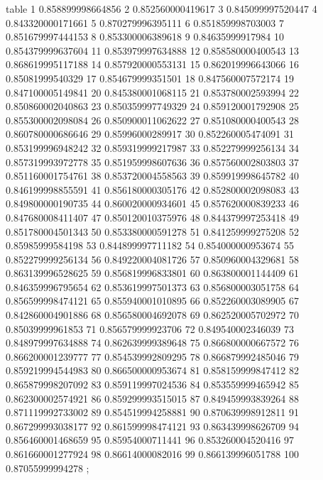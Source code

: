 \nextgroupplot[title=Seed 10,
height=\figheight,
legend cell align={left},
legend columns=-1,
legend style={
  nodes={scale=0.85},
  fill opacity=0.8,
  draw opacity=1,
  text opacity=1,
  at={(-0.20,1.36)},%
  anchor=south west,
  draw=white!80!black
},
minor xtick={25, 75},
minor ytick={},
tick align=outside,
tick pos=left,
width=\figwidth,
x grid style={white!69.0196078431373!black},
xlabel={Eval. Steps},
xminorgrids,
xmajorgrids,
xmin=-3.95, xmax=104.95,
xtick style={color=black},
xtick={-25,0,50,100,125},
xticklabels={-25,0,50,100,125},
y grid style={white!69.0196078431373!black},
ylabel={ACC (\%)},
ymajorgrids,
ymin=0.83, ymax=0.89,
ytick style={color=black},
ytick={0.83,0.84,0.85,0.86,0.87,0.88,0.89},
yticklabels={83,84,85,86,87,88,89}
]
table {%
	1 0.858899998664856
	2 0.852560000419617
	3 0.845099997520447
	4 0.843320000171661
	5 0.870279996395111
	6 0.851859998703003
	7 0.851679997444153
	8 0.853300006389618
	9 0.84635999917984
	10 0.854379999637604
	11 0.853979997634888
	12 0.858580000400543
	13 0.868619995117188
	14 0.857920000553131
	15 0.862019996643066
	16 0.85081999540329
	17 0.854679999351501
	18 0.847560007572174
	19 0.847100005149841
	20 0.845380001068115
	21 0.853780002593994
	22 0.850860002040863
	23 0.850359997749329
	24 0.859120001792908
	25 0.855300002098084
	26 0.850900011062622
	27 0.851080000400543
	28 0.860780000686646
	29 0.85996000289917
	30 0.852260005474091
	31 0.853199996948242
	32 0.859319999217987
	33 0.852279999256134
	34 0.857319993972778
	35 0.851959998607636
	36 0.857560002803803
	37 0.851160001754761
	38 0.853720004558563
	39 0.859919998645782
	40 0.846199998855591
	41 0.856180000305176
	42 0.852800002098083
	43 0.849800000190735
	44 0.860020000934601
	45 0.857620000839233
	46 0.847680008411407
	47 0.850120010375976
	48 0.844379997253418
	49 0.851780004501343
	50 0.853380000591278
	51 0.841259999275208
	52 0.85985999584198
	53 0.844899997711182
	54 0.854000000953674
	55 0.852279999256134
	56 0.849220004081726
	57 0.850960004329681
	58 0.863139996528625
	59 0.856819996833801
	60 0.863800001144409
	61 0.846359996795654
	62 0.853619997501373
	63 0.856800003051758
	64 0.856599998474121
	65 0.855940001010895
	66 0.852260003089905
	67 0.842860004901886
	68 0.856580004692078
	69 0.862520005702972
	70 0.85039999961853
	71 0.856579999923706
	72 0.849540002346039
	73 0.848979997634888
	74 0.862639999389648
	75 0.866800000667572
	76 0.866200001239777
	77 0.854539992809295
	78 0.866879992485046
	79 0.859219994544983
	80 0.866500000953674
	81 0.858159999847412
	82 0.865879998207092
	83 0.859119997024536
	84 0.853559999465942
	85 0.862300002574921
	86 0.859299993515015
	87 0.849459993839264
	88 0.871119992733002
	89 0.854519994258881
	90 0.870639998912811
	91 0.867299993038177
	92 0.861599998474121
	93 0.863439998626709
	94 0.856460001468659
	95 0.85954000711441
	96 0.853260004520416
	97 0.861660001277924
	98 0.86614000082016
	99 0.866139996051788
	100 0.87055999994278
};
